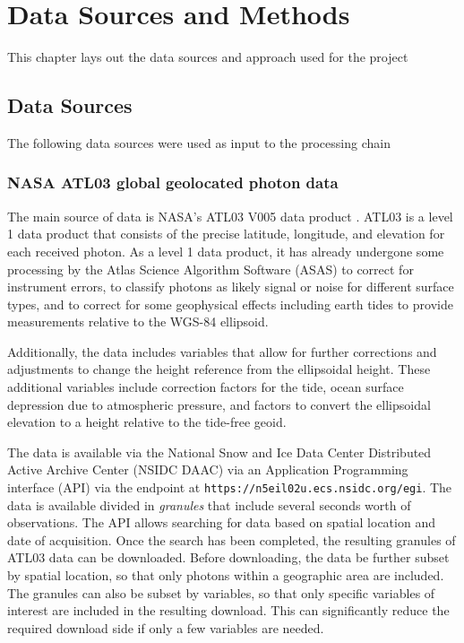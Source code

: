 \chapter{Data Sources and Methods}\label{sec:methodology}
This chapter lays out the data sources and approach used for the project
\section{Data Sources}
The following data sources were used as input to the processing chain
\subsection{NASA ATL03 global geolocated photon data}

The main source of data is NASA's ATL03 V005 data product \parencite{icesat2data}. ATL03 is a level 1 data product that consists of the precise latitude, longitude, and elevation for each received photon. As a level 1 data product, it has already undergone some processing by the Atlas Science Algorithm Software (ASAS) to correct for instrument errors, to classify photons as likely signal or noise for different surface types, and to correct for some geophysical effects including earth tides to provide measurements relative to the WGS-84 ellipsoid. 

Additionally, the data includes variables that allow for further corrections and adjustments to change the height reference from the ellipsoidal height. These additional variables include correction factors for the tide, ocean surface depression due to atmospheric pressure, and factors to convert the ellipsoidal elevation to a height relative to the tide-free geoid.

The data is available via the National Snow and Ice Data Center Distributed Active Archive Center (NSIDC DAAC) via an Application Programming interface (API) via the endpoint at \texttt{https://n5eil02u.ecs.nsidc.org/egi}. The data is available divided in \emph{granules} that include several seconds worth of observations. The API allows searching for data based on spatial location and date of acquisition. Once the search has been completed, the resulting granules of ATL03 data can be downloaded. Before downloading, the data be further subset by spatial location, so that only photons within a geographic area are included. The granules can also be subset by variables, so that only specific variables of interest are included in the resulting download. This can significantly reduce the required download side if only a few variables are needed.


